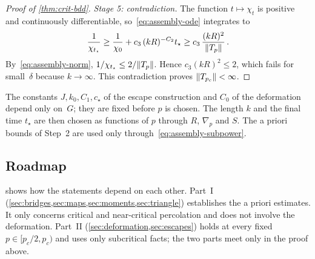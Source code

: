 \begin{proof}[Proof of \cref{thm:crit-bdd}]
\emph{Stage 5: contradiction.}
The function $t\mapsto\chi_t$ is positive and continuously differentiable, so~\eqref{eq:assembly-ode}
integrates to
\begin{equation*}
  \frac{1}{\chi_{t_\star}}\ge\frac1{\chi_0}+c_3\,(kR)^{-C_2}t_\star\ge c_3\,\frac{(kR)^2}{\lVert T_p\rVert}\,.
\end{equation*}
By~\eqref{eq:assembly-norm}, $1/\chi_{t_\star}\le2/\lVert T_p\rVert$. Hence $c_3(kR)^2\le2$, which fails for
small~$\delta$ because $k\to\infty$. This contradiction proves $\lVert T_{p_c}\rVert<\infty$.
\end{proof}

\begin{remark}\label{rem:order}
The constants $J,k_0,C_1,c_\star$ of the escape construction and $C_0$ of the deformation depend only
on~$G$; they are fixed before $p$ is chosen. The length $k$ and the final time $t_\star$ are then chosen
as functions of $p$ through $R$, $\nabla_p$ and $S$. The a priori bounds of Step~2 are used only
through~\eqref{eq:assembly-subpower}.
\end{remark}

\subsection{Roadmap}\label{sec:roadmap}

 shows how the statements depend on each other. Part~I
(\cref{sec:bridges,sec:maps,sec:moments,sec:triangle}) establishes the a priori estimates. It only
concerns critical and near-critical percolation and does not involve the deformation. Part~II
(\cref{sec:deformation,sec:escapes}) holds at every fixed $p\in[p_c/2,p_c)$ and uses only subcritical
facts; the two parts meet only in the proof above.

